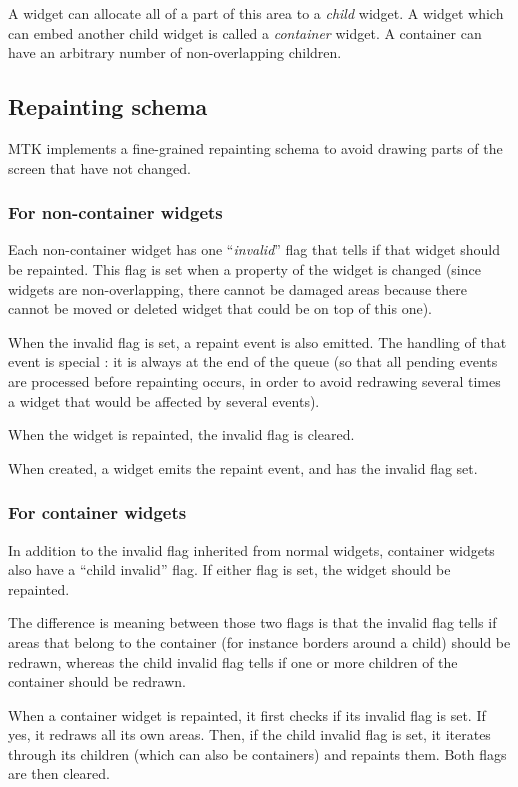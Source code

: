 \documentclass[a4paper,11pt]{journal}
\begin{document}
A widget can allocate all of a part of this area to a \textit{child} widget. A widget which can embed another child widget is called a \textit{container} widget. A container can have an arbitrary number of non-overlapping children.

\subsection{Repainting schema}
MTK implements a fine-grained repainting schema to avoid drawing parts of the screen that have not changed.

\subsubsection{For non-container widgets} Each non-container widget has one ``\textit{invalid}'' flag that tells if that widget should be repainted. This flag is set when a property of the widget is changed (since widgets are non-overlapping, there cannot be damaged areas because there cannot be moved or deleted widget that could be on top of this one).

When the invalid flag is set, a repaint event is also emitted. The handling of that event is special : it is always at the end of the queue (so that all pending events are processed before repainting occurs, in order to avoid redrawing several times a widget that would be affected by several events).

When the widget is repainted, the invalid flag is cleared.

When created, a widget emits the repaint event, and has the invalid flag set.

\subsubsection{For container widgets} In addition to the invalid flag inherited from normal widgets, container widgets also have a ``child invalid'' flag. If either flag is set, the widget should be repainted.

The difference is meaning between those two flags is that the invalid flag tells if areas that belong to the container (for instance borders around a child) should be redrawn, whereas the child invalid flag tells if one or more children of the container should be redrawn.

When a container widget is repainted, it first checks if its invalid flag is set. If yes, it redraws all its own areas. Then, if the child invalid flag is set, it iterates through its children (which can also be containers) and repaints them. Both flags are then cleared.
\end{document}
